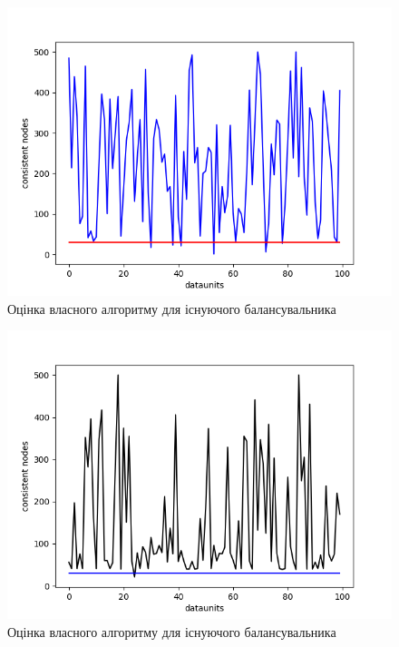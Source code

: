 \documentclass[14pt]{vakthesis}
\begin{document}
\begin{figure}
\centering

\includegraphics[width=\linewidth]{images/lb_custom/w_10_r_500.png}

     \caption{Оцінка власного алгоритму для існуючого балансувальника}
     \label{fig:lb_custom_10}
\end{figure}


\begin{figure}
\centering

\includegraphics[width=\linewidth]{images/lb_custom/w_100_r_500.png}

     \caption{Оцінка власного алгоритму для існуючого балансувальника}
     \label{fig:lb_custom_100}
\end{figure}
\end{document}
